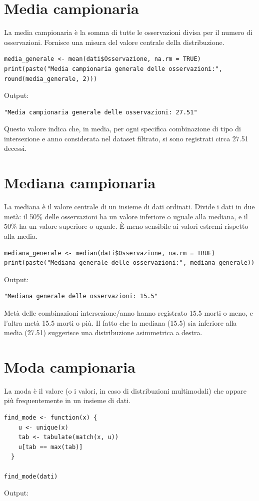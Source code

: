 \documentclass[14pt, openany, titlepage]{report} %
\begin{document}
\section{Media campionaria}
La media campionaria è la somma di tutte le osservazioni divisa per il numero di osservazioni.
 Fornisce una misura del valore centrale della distribuzione.
\begin{center}
\begin{lstlisting}[breaklines=true]
media_generale <- mean(dati$Osservazione, na.rm = TRUE)
print(paste("Media campionaria generale delle osservazioni:", round(media_generale, 2)))
\end{lstlisting}  
\end{center}
\noindent
Output: 
\begin{verbatim}
"Media campionaria generale delle osservazioni: 27.51"
\end{verbatim}
Questo valore indica che, in media, per ogni specifica combinazione di tipo di intersezione e anno considerata nel dataset filtrato, si sono registrati circa 27.51 decessi.

\section{Mediana campionaria}
La mediana è il valore centrale di un insieme di dati ordinati.
 Divide i dati in due metà: il 50\% delle osservazioni ha un valore
  inferiore o uguale alla mediana, e il 50\% ha un valore superiore
   o uguale. È meno sensibile ai valori estremi rispetto alla media.

\begin{center}
\begin{lstlisting}[breaklines=true]
mediana_generale <- median(dati$Osservazione, na.rm = TRUE)
print(paste("Mediana generale delle osservazioni:", mediana_generale))
\end{lstlisting}  
\end{center}
\noindent
Output:
\begin{verbatim}
"Mediana generale delle osservazioni: 15.5"
\end{verbatim}
Metà delle combinazioni intersezione/anno hanno registrato 15.5 morti 
o meno, e l'altra metà 15.5 morti o più. Il fatto che la mediana (15.5)
 sia inferiore alla media (27.51) suggerisce una distribuzione 
 asimmetrica a destra.


\section{Moda campionaria}
La moda è il valore (o i valori, in caso di distribuzioni multimodali)
 che appare più frequentemente in un insieme di dati.
\begin{center}
\begin{lstlisting}[breaklines=true]
find_mode <- function(x) {
    u <- unique(x)
    tab <- tabulate(match(x, u))
    u[tab == max(tab)]
  }

find_mode(dati)
\end{lstlisting}  
\end{center}
\noindent
Output: 
\end{document}
